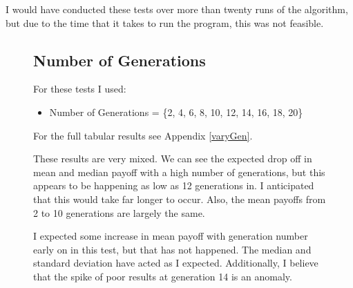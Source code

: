 I would have conducted these tests over more than twenty runs of the algorithm, but due to the time that it takes to run the program, this was not feasible.

\vspace{30mm}

\begin{figure}[p]
    \setlength{\parindent}{24pt}
    \subsection{Number of Generations} \label{numGenTest}
    For these tests I used: 
    \begin{itemize}
        \item Number of Generations = \{2, 4, 6, 8, 10, 12, 14, 16, 18, 20\}
    \end{itemize}
    
    \begin{center}
    \end{center}
    
    \noindent For the full tabular results see Appendix \ref{varyGen}.
    \vspace{4mm}
    
    {\centering
    }
    \newline
    
    These results are very mixed. We can see the expected drop off in mean and median payoff with a high number of generations, but this appears to be happening as low as 12 generations in. I anticipated that this would take far longer to occur. Also, the mean payoffs from 2 to 10 generations are largely the same. \newline

    I expected some increase in mean payoff with generation number early on in this test, but that has not happened. The median and standard deviation have acted as I expected. Additionally, I believe that the spike of poor results at generation 14 is an anomaly.
\end{figure}


